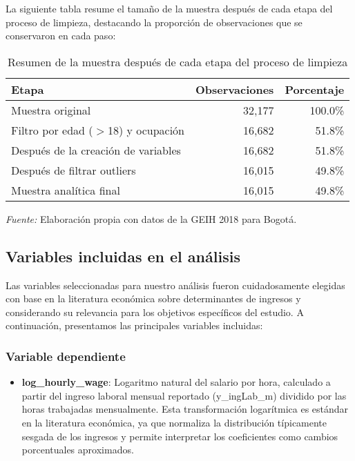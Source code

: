 \documentclass[12pt,a4paper,onecolumn]{article}
\begin{document}
La siguiente tabla resume el tamaño de la muestra después de cada etapa del proceso de limpieza, destacando la proporción de observaciones que se conservaron en cada paso:

\begin{table}[htbp]
    \centering
    \caption{Resumen de la muestra después de cada etapa del proceso de limpieza}
    \label{tab:sample_summary}
    \begin{tabular}{lrr}
    \toprule
    \textbf{Etapa} & \textbf{Observaciones} & \textbf{Porcentaje} \\
    \midrule
    Muestra original & 32,177 & 100.0\% \\
    Filtro por edad ($>$18) y ocupación & 16,682 & 51.8\% \\
    Después de la creación de variables & 16,682 & 51.8\% \\
    Después de filtrar outliers & 16,015 & 49.8\% \\
    Muestra analítica final & 16,015 & 49.8\% \\
    \bottomrule
    \end{tabular}
    \begin{flushleft}
    \footnotesize \textit{Fuente:} Elaboración propia con datos de la GEIH 2018 para Bogotá.
    \end{flushleft}
\end{table}

\subsection{Variables incluidas en el análisis}

Las variables seleccionadas para nuestro análisis fueron cuidadosamente elegidas con base en la literatura económica sobre determinantes de ingresos y considerando su relevancia para los objetivos específicos del estudio. A continuación, presentamos las principales variables incluidas:

\subsubsection{Variable dependiente}

\begin{itemize}
    \item \textbf{log\_hourly\_wage}: Logaritmo natural del salario por hora, calculado a partir del ingreso laboral mensual reportado (y\_ingLab\_m) dividido por las horas trabajadas mensualmente. Esta transformación logarítmica es estándar en la literatura económica, ya que normaliza la distribución típicamente sesgada de los ingresos y permite interpretar los coeficientes como cambios porcentuales aproximados.
\end{itemize}
\end{document}
